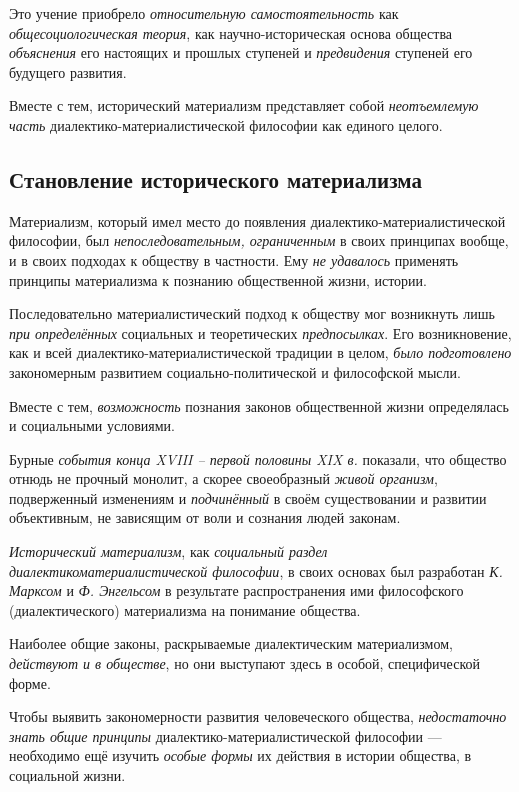 \documentclass[a4paper,14pt,russian]{extreport}
\begin{document}
Это учение приобрело \emph{относительную самостоятельность} как \emph{общесоциологическая теория}, как научно-историческая основа общества \emph{объяснения} его настоящих и прошлых ступеней и \emph{предвидения} ступеней его будущего развития.

Вместе с тем, исторический материализм представляет собой \emph{неотъемлемую часть} диалектико-материалистической философии как единого целого.

\subsection{Становление исторического материализма}

Материализм, который имел место до появления диалектико-материалистической философии, был \emph{непоследовательным, ограниченным} в своих принципах вообще, и в своих подходах к обществу в частности. Ему \emph{не удавалось} применять принципы материализма к познанию общественной жизни, истории.

Последовательно материалистический подход к обществу мог возникнуть лишь \emph{при определённых} социальных и теоретических \emph{предпосылках}. Его возникновение, как и всей диалектико-материалистической традиции в целом, \emph{было подготовлено} закономерным развитием социально-политической и философской мысли.

Вместе с тем, \emph{возможность} познания законов общественной жизни определялась и социальными условиями.

Бурные \emph{события конца XVIII -- первой половины XIX в.} показали, что общество отнюдь не прочный монолит, а скорее своеобразный \emph{живой организм}, подверженный изменениям и \emph{подчинённый} в своём существовании и развитии объективным, не зависящим от воли и сознания людей законам.

\emph{Исторический материализм}, как \emph{социальный раздел диалектикоматериалистической философии}, в своих основах был разработан \emph{К. Марксом} и \emph{Ф. Энгельсом} в результате распространения ими философского (диалектического) материализма на понимание общества.

Наиболее общие законы, раскрываемые диалектическим материализмом, \emph{действуют и в обществе}, но они выступают здесь в особой, специфической форме.

Чтобы выявить закономерности развития человеческого общества, \emph{недостаточно знать общие принципы} диалектико-материалистической философии --- необходимо ещё изучить \emph{особые формы} их действия в истории общества, в социальной жизни.
\end{document}
